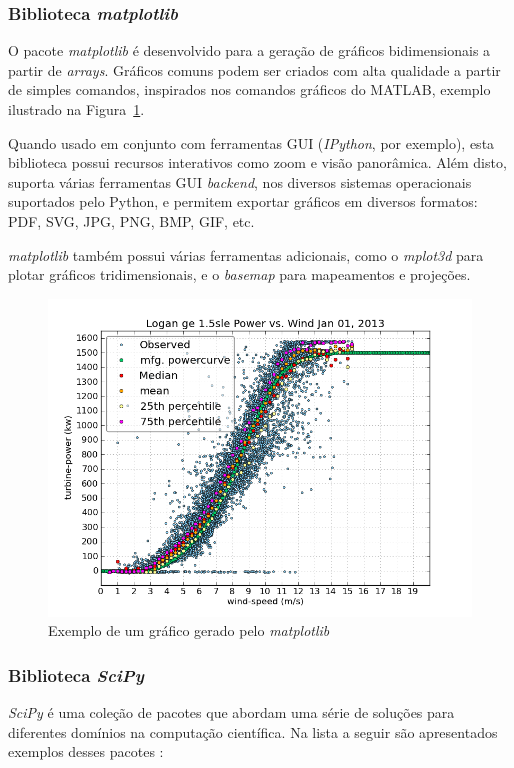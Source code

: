 \subsubsection{Biblioteca \textit{matplotlib}}
O pacote \textit{matplotlib} é desenvolvido para a geração de gráficos bidimensionais a partir de \textit{arrays}. Gráficos comuns podem ser criados com alta qualidade a partir de simples comandos, inspirados nos comandos gráficos do MATLAB, exemplo ilustrado na Figura~\ref{matplotlib-fig}.

Quando usado em conjunto com ferramentas GUI (\textit{IPython}, por exemplo), esta biblioteca possui recursos interativos como zoom e visão panorâmica. Além disto, suporta várias ferramentas GUI \textit{backend}, nos diversos sistemas operacionais suportados pelo Python, e permitem exportar gráficos em diversos formatos: PDF, SVG, JPG, PNG, BMP, GIF, etc.

\textit{matplotlib} também possui várias ferramentas adicionais, como o \textit{mplot3d} para plotar gráficos tridimensionais, e o \textit{basemap} para mapeamentos e projeções.

\begin{figure}[h!]
  \includegraphics[width=1\textwidth]{Cap4/imagens/matplotlib}
  \caption{Exemplo de um gráfico gerado pelo \textit{matplotlib}}
  \label{matplotlib-fig}
\end{figure}


\subsubsection{Biblioteca \textit{SciPy}}
\textit{SciPy} é uma coleção de pacotes que abordam uma série de soluções para diferentes domínios na computação científica. Na lista a seguir são apresentados exemplos desses pacotes \cite{python-analysis}:

